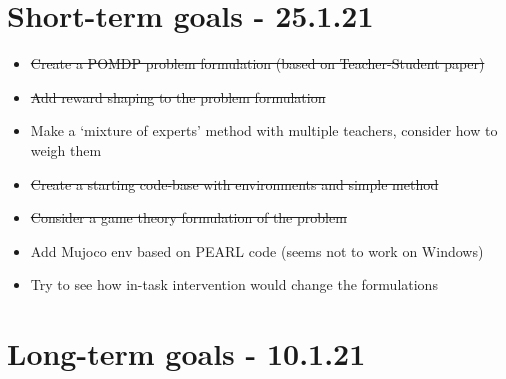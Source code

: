 \documentclass[letterpaper]{article}
\theoremstyle{definition}
\begin{document}
\section{Short-term goals - 25.1.21} \label{sec:short-term}

\begin{itemize}
	\item \sout{Create a POMDP problem formulation (based on Teacher-Student paper) }
	\item \sout{Add reward shaping to the problem formulation}
	\item Make a `mixture of experts' method with multiple teachers, consider how to weigh them
	\item \sout{Create a starting code-base with environments and simple method}
	\item \sout{Consider a game theory formulation of the problem}
	\item Add Mujoco env based on PEARL code (seems not to work on Windows)
	\item Try to see how in-task intervention would change the formulations
\end{itemize}

\section{Long-term goals - 10.1.21} \label{sec:long-term}

\clearpage


\end{document}
